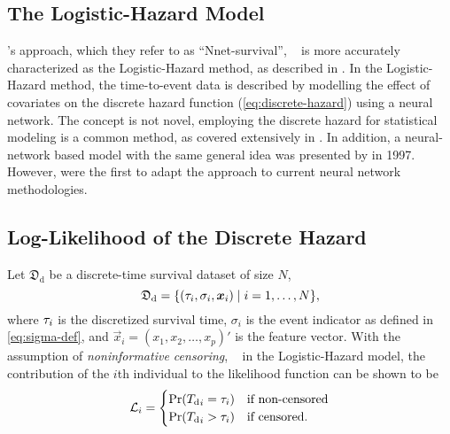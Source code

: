 \subsection{The Logistic-Hazard Model}

's approach, 
which they refer to as \enquote{Nnet-survival},
~\autocite{gensheimerScalable2019}
is more accurately characterized as the Logistic-Hazard method, 
as described in \textcite{kvammeContinuous2021}.
In the Logistic-Hazard method, 
the time-to-event data is described by 
modelling the effect of covariates on the discrete hazard function 
(\cref{eq:discrete-hazard}) 
using a neural network.
The concept is not novel, 
employing the discrete hazard for statistical modeling is a common method, 
as covered extensively in \textcite{tutzModeling2016}. 
In addition, a neural-network based model with the same general idea 
was presented by \citeauthor{brownUse1997} in 1997.
~\autocite{brownUse1997}
However, 
\citeauthor{gensheimerScalable2019} were the first to adapt the approach
to current neural network methodologies.

\subsection{Log-Likelihood of the Discrete Hazard}

Let \(\mathfrak{D}_{\mathrm{d}}\) 
be a discrete-time survival dataset of size \(N\),
\begin{equation}
    \mathfrak{D}_{\mathrm{d}} = 
    \{(\tau_i, \sigma_i, \bm{x}_i) \mid i = 1, \ldots, N\},
\end{equation}
where \(\tau_i\) is the discretized survival time, 
\(\sigma_i\) is the event indicator as defined in \cref{eq:sigma-def},
and \(\vec{x}_i = (x_1, x_2, \dots, x_p)'\) is the feature vector.
With the assumption of \emph{noninformative censoring},
~\autocite{kalbfleischStatistical2002}
in the Logistic-Hazard model, 
the contribution of the \(i\)th individual to the likelihood function
can be shown to be  
~\autocite{tutzModeling2016}
\begin{equation}
    \Lik_i = %
    \begin{cases}
        \PR (\Tid_i = \tid_i) & \text{if non-censored} \\
        \PR (\Tid_i > \tid_i) & \text{if censored}.
    \end{cases}
\end{equation}

